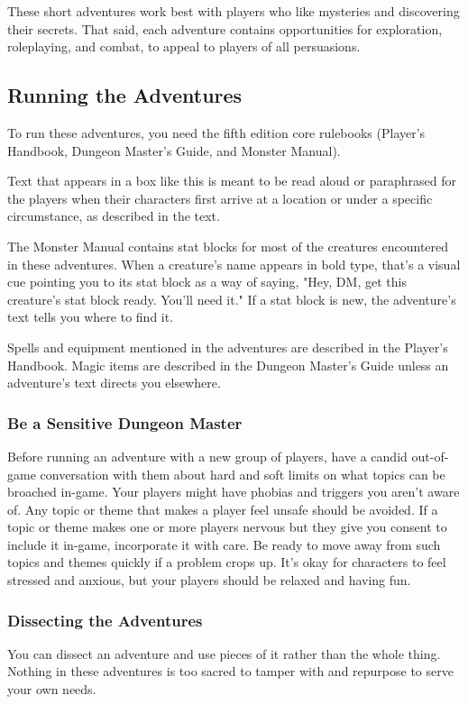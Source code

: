 \documentclass[10pt,a4paper,twoside,bg=print,twocolumn,openany,nodeprecatedcode]{dndbook}
\begin{document}
These short adventures work best with players who like mysteries and discovering their secrets. That said, each adventure contains opportunities for exploration, roleplaying, and combat, to appeal to players of all persuasions.

\subsection{Running the Adventures}
To run these adventures, you need the fifth edition core rulebooks (Player's Handbook, Dungeon Master's Guide, and Monster Manual).

\begin{DndReadAloud}{}
Text that appears in a box like this is meant to be read aloud or paraphrased for the players when their characters first arrive at a location or under a specific circumstance, as described in the text. 

\end{DndReadAloud}

The Monster Manual contains stat blocks for most of the creatures encountered in these adventures. When a creature's name appears in bold type, that's a visual cue pointing you to its stat block as a way of saying, "Hey, DM, get this creature's stat block ready. You'll need it." If a stat block is new, the adventure's text tells you where to find it.

Spells and equipment mentioned in the adventures are described in the Player's Handbook. Magic items are described in the Dungeon Master's Guide unless an adventure's text directs you elsewhere.

\subsubsection{Be a Sensitive Dungeon Master}
Before running an adventure with a new group of players, have a candid out-of-game conversation with them about hard and soft limits on what topics can be broached in-game. Your players might have phobias and triggers you aren't aware of. Any topic or theme that makes a player feel unsafe should be avoided. If a topic or theme makes one or more players nervous but they give you consent to include it in-game, incorporate it with care. Be ready to move away from such topics and themes quickly if a problem crops up. It's okay for characters to feel stressed and anxious, but your players should be relaxed and having fun.

\subsubsection{Dissecting the Adventures}
You can dissect an adventure and use pieces of it rather than the whole thing. Nothing in these adventures is too sacred to tamper with and repurpose to serve your own needs.
\end{document}
